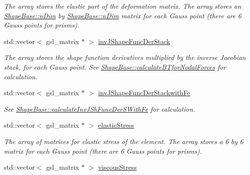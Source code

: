 \begin{DoxyCompactItemize}
\begin{DoxyCompactList}\small\item\em The array stores the elastic part of the deformation matrix. The array stores an \hyperlink{classShapeBase_a0ae4246d158f4d66b5bd1644df40f150}{Shape\+Base\+::n\+Dim} by \hyperlink{classShapeBase_a0ae4246d158f4d66b5bd1644df40f150}{Shape\+Base\+::n\+Dim} matrix for each Gauss point (there are 6 Gauss points for prisms). \end{DoxyCompactList}\item 
\hypertarget{classShapeBase_a18ef46748c8632768c6be10987f1c0e3}{}std\+::vector$<$ gsl\+\_\+matrix $\ast$ $>$ \hyperlink{classShapeBase_a18ef46748c8632768c6be10987f1c0e3}{inv\+J\+Shape\+Func\+Der\+Stack}\label{classShapeBase_a18ef46748c8632768c6be10987f1c0e3}

\begin{DoxyCompactList}\small\item\em The array stores the shape function derivatives multiplied by the inverse Jacobian stack, for each Gauss point. See \hyperlink{classShapeBase_ad67919694a1d780e31f6d539781377be}{Shape\+Base\+::calculate\+B\+Tfor\+Nodal\+Forces} for calculation. \end{DoxyCompactList}\item 
\hypertarget{classShapeBase_a90987ba8732360351b3994e6566c6093}{}std\+::vector$<$ gsl\+\_\+matrix $\ast$ $>$ \hyperlink{classShapeBase_a90987ba8732360351b3994e6566c6093}{inv\+J\+Shape\+Func\+Der\+Stackwith\+Fe}\label{classShapeBase_a90987ba8732360351b3994e6566c6093}

\begin{DoxyCompactList}\small\item\em See \hyperlink{classShapeBase_a8d984ddba5bbeae91cb3180897a5a3e7}{Shape\+Base\+::calculate\+Inv\+J\+Sh\+Func\+Der\+S\+With\+Fe} for calculation. \end{DoxyCompactList}\item 
\hypertarget{classShapeBase_adec28da3cbed6bf4aad8370bd5cdad81}{}std\+::vector$<$ gsl\+\_\+matrix $\ast$ $>$ \hyperlink{classShapeBase_adec28da3cbed6bf4aad8370bd5cdad81}{elastic\+Stress}\label{classShapeBase_adec28da3cbed6bf4aad8370bd5cdad81}

\begin{DoxyCompactList}\small\item\em The array of matrices for elastic stress of the element. The array stores a 6 by 6 matrix for each Gauss point (there are 6 Gauss points for prisms). \end{DoxyCompactList}\item 
\hypertarget{classShapeBase_a29f180dc41c5b6e12b9468dd557bb524}{}std\+::vector$<$ gsl\+\_\+matrix $\ast$ $>$ \hyperlink{classShapeBase_a29f180dc41c5b6e12b9468dd557bb524}{viscous\+Stress}\label{classShapeBase_a29f180dc41c5b6e12b9468dd557bb524}


\end{DoxyCompactItemize}
